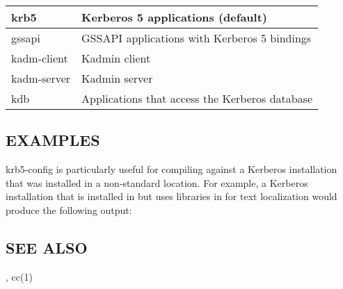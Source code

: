 \documentclass[letterpaper,10pt,english]{sphinxmanual}
\begin{document}
\begin{description}
\begin{savenotes}\sphinxattablestart
\centering
\begin{tabulary}{\linewidth}[t]{|T|T|}
\hline

krb5
&
Kerberos 5 applications (default)
\\
\hline
gssapi
&
GSSAPI applications with Kerberos 5 bindings
\\
\hline
kadm-client
&
Kadmin client
\\
\hline
kadm-server
&
Kadmin server
\\
\hline
kdb
&
Applications that access the Kerberos database
\\
\hline
\end{tabulary}
\par
\sphinxattableend\end{savenotes}

\end{description}


\subsection{EXAMPLES}
\label{\detokenize{user/user_commands/krb5-config:examples}}
krb5-config is particularly useful for compiling against a Kerberos
installation that was installed in a non-standard location.  For example,
a Kerberos installation that is installed in  but uses
libraries in  for text localization would produce
the following output:

%
\begin{sphinxVerbatim}[commandchars=\\\{\}]
   
      
\end{sphinxVerbatim}


\subsection{SEE ALSO}
\label{\detokenize{user/user_commands/krb5-config:see-also}}
{\hyperref[\detokenize{user/user_config/kerberos:kerberos-7}]{}}, cc(1)
\end{document}
